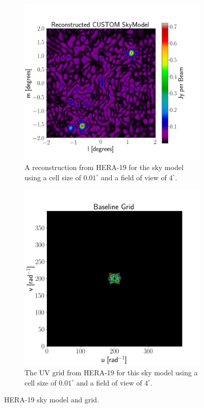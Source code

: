 \begin{figure}[H]
  \centering
  \begin{subfigure}[b]{0.49\textwidth}
    \centering
    \includegraphics[scale=0.3]{images/RECON_HERA_19_4_POINT.png}
    \caption{A reconstruction from HERA-19 for the sky model using a cell size of $0.01^\circ$ and a field of view of $4^\circ$.}
    \label{fig:hera-19_recon}
  \end{subfigure}
  \begin{subfigure}[b]{0.49\textwidth}
    \centering
    \includegraphics[scale=0.3]{images/HERA_19_4_POINT_GRID.png}
    \caption{The UV grid from HERA-19 for this sky model using a cell size of $0.01^\circ$ and a field of view of $4^\circ$.}
    \label{fig:hera-19_grid}
  \end{subfigure}
  \caption{HERA-19 sky model and grid.}
  \label{fig:HERA-19_model}
 \end{figure}


